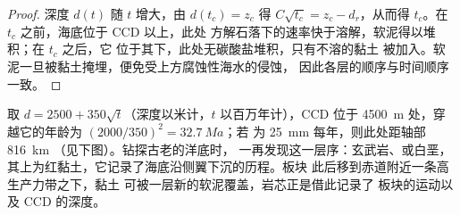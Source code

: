 \begin{proof}
深度 $d(t)$ 随 $t$ 增大，由 $d(t_c) = z_c$ 得 $C\sqrt{t_c} =
z_c - d_r$，从而得 $t_c$。在 $t_c$ 之前，海底位于 CCD 以上，此处
方解石落下的速率快于溶解，软泥得以堆积；在 $t_c$ 之后，它
位于其下，此处无碳酸盐堆积，只有不溶的黏土
被加入。软泥一旦被黏土掩埋，便免受上方腐蚀性海水的侵蚀，
因此各层的顺序与时间顺序一致。
\end{proof}

取 $d = 2500 + 350\sqrt t$（深度以米计，$t$ 以百万年计），CCD 位于
\qty{4500}{m} 处，穿越它的年龄为 $(2000/350)^2 = \qty{32.7}{Ma}$；若
为 \qty{25}{mm} 每年，则此处距轴部 \qty{816}{km}
（见下图）。钻探古老的洋底时，
一再发现这一层序：玄武岩、或白垩，
其上为红黏土，它记录了海底沿侧翼下沉的历程。板块
此后移到赤道附近一条高生产力带之下，黏土
可被一层新的软泥覆盖，岩芯正是借此记录了
板块的运动以及 CCD 的深度。

